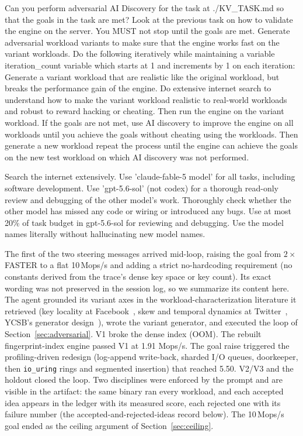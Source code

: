 \documentclass{article}
\newenvironment{promptbox}{\begin{mdframed}[linewidth=0.4pt,linecolor=black,innerleftmargin=5pt,innerrightmargin=5pt,innertopmargin=5pt,innerbottommargin=5pt,skipabove=2pt,skipbelow=5pt]\setlength{\parskip}{0pt}\setlength{\parindent}{0pt}\ttfamily\scriptsize\raggedright\frenchspacing\obeylines\leavevmode\strut\ignorespaces}{\end{mdframed}}
\begin{document}
\begin{promptbox}
Can you perform adversarial AI Discovery for the task at ./KV\_TASK.md so that the goals in the task are met?  Look at the previous task on how to validate the engine on the server.  You MUST not stop until the goals are met.  Generate adversarial workload variants to make sure that the engine works fast on the variant workloads.  Do the following iteratively while maintaining a variable iteration\_count variable which starts at 1 and increments by 1 on each iteration:
Generate a variant workload that are realistic like the original workload, but breaks the performance gain of the engine. Do extensive internet search to understand how to make the variant workload realistic to real-world workloads and robust to reward hacking or cheating.  Then run the engine on the variant workload.  If the goals are not met, use AI discovery to improve the engine on all workloads until you achieve the goals without cheating using the workloads.  Then generate a new workload repeat the process until the engine can achieve the goals on the new test workload on which AI discovery was not performed.
\strut
Search the internet extensively. Use 'claude-fable-5 model' for all tasks, including software development. Use 'gpt-5.6-sol' (not codex) for a thorough read-only review and debugging of the other model's work. Thoroughly check whether the other model has missed any code or wiring or introduced any bugs. Use at most 20\% of task budget in gpt-5.6-sol for reviewing and debugging. Use the model names literally without hallucinating new model names.
\end{promptbox}

The first of the two steering messages arrived mid-loop, raising the goal from $2\times$ FASTER to a flat 10\,Mops/s and adding a strict no-hardcoding requirement (no constants derived from the trace's dense key space or key count). Its exact wording was not preserved in the session log, so we summarize its content here. The agent grounded its variant axes in the workload-characterization literature it retrieved (key locality at Facebook~\cite{cao-fast20}, skew and temporal dynamics at Twitter~\cite{yang-osdi20}, YCSB's generator design~\cite{ycsb}), wrote the variant generator, and executed the loop of Section~\ref{sec:adversarial}. V1 broke the dense index (OOM). The rebuilt fingerprint-index engine passed V1 at 1.91 Mops/s. The goal raise triggered the profiling-driven redesign (log-append write-back, sharded I/O queues, doorkeeper, then \texttt{io\_uring} rings and segmented insertion) that reached 5.50. V2/V3 and the holdout closed the loop. Two disciplines were enforced by the prompt and are visible in the artifact: the same binary ran every workload, and each accepted idea appears in the ledger with its measured score, each rejected one with its failure number (the accepted-and-rejected-ideas record below). The 10\,Mops/s goal ended as the ceiling argument of Section~\ref{sec:ceiling}.
\end{document}
